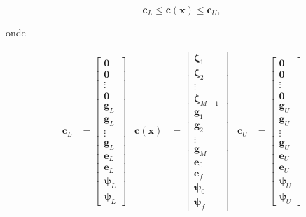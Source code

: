 \begin{equation}
    \mathbf{c}_L \leq \mathbf{c}(\mathbf{x}) \leq \mathbf{c}_U,
\end{equation}

\noindent onde

\begin{align}
    \mathbf{c}_L &= 
    \begin{bmatrix} 
        \mathbf{0} \\ \mathbf{0} \\ \vdots \\ \mathbf{0} \\
        \mathbf{g}_L \\ \mathbf{g}_L \\ \vdots \\ \mathbf{g}_L \\
        \mathbf{e}_L \\ \mathbf{e}_L \\
        \boldsymbol{\psi}_L \\ \boldsymbol{\psi}_L
    \end{bmatrix}
    &
    \mathbf{c}(\mathbf{x}) &= 
    \begin{bmatrix} 
        \boldsymbol{\zeta}_1 \\ \boldsymbol{\zeta}_2 \\ \vdots \\ \boldsymbol{\zeta}_{M-1} \\ 
        \mathbf{g}_1 \\ \mathbf{g}_2 \\ \vdots \\ \mathbf{g}_{M} \\
        \mathbf{e}_0 \\ \mathbf{e}_f \\
        \boldsymbol{\psi}_0 \\ \boldsymbol{\psi}_f
    \end{bmatrix}
    &
    \mathbf{c}_U &= 
    \begin{bmatrix} 
        \mathbf{0} \\ \mathbf{0} \\ \vdots \\ \mathbf{0} \\
        \mathbf{g}_U \\ \mathbf{g}_U \\ \vdots \\ \mathbf{g}_U \\
        \mathbf{e}_U \\ \mathbf{e}_U \\
        \boldsymbol{\psi}_U \\ \boldsymbol{\psi}_U
    \end{bmatrix}
\end{align}


